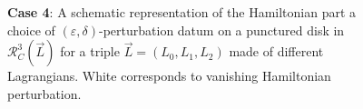\begin{center}
\begin{figure}
{\begin{tikzpicture}
			\end{tikzpicture}}
			
			\caption{\textbf{Case 4}: A schematic representation of the Hamiltonian part a choice of $(\varepsilon,\delta)$-perturbation datum on a punctured disk in $\mathcal{R}^3_C(\vec{L})$ for a triple $\vec{L}=(L_0,L_1,L_2)$ made of different Lagrangians. White corresponds to vanishing Hamiltonian perturbation.}
			
		\end{figure}
		
	\end{center}
	
